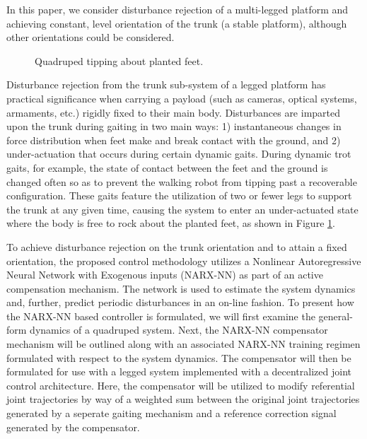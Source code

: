 In this paper, we consider disturbance rejection of a multi-legged platform and achieving constant, level orientation of the trunk (\IE a stable platform), although other orientations could be considered. 
	\begin{figure}[b!]
		\vspace{-7mm}
		\centering
		\caption{ Quadruped tipping about planted feet.}
		\label{fig::quadruped_walking}
	\end{figure}
Disturbance rejection from the trunk sub-system of a legged platform has practical significance when carrying a payload (such as cameras, optical systems, armaments, etc.) rigidly fixed to their main body. Disturbances are imparted upon the trunk during gaiting in two main ways: 1) instantaneous changes in force distribution when feet make and break contact with the ground, and 2) under-actuation that occurs during certain dynamic gaits. During dynamic trot gaits, for example, the state of contact between the feet and the ground is changed often so as to prevent the walking robot from tipping past a recoverable configuration. These gaits feature the utilization of two or fewer legs to support the trunk at any given time, causing the system to enter an under-actuated state where the body is free to rock about the planted feet, as shown in Figure \ref{fig::quadruped_walking}.

To achieve disturbance rejection on the trunk orientation and to attain a fixed orientation, the proposed control methodology utilizes a Nonlinear Autoregressive Neural Network with Exogenous inputs (NARX-NN) as part of an active compensation mechanism. The network is used to estimate the system dynamics and, further, predict periodic disturbances in an on-line fashion. To present how the NARX-NN based controller is formulated, we will first examine the general-form dynamics of a quadruped system. Next, the NARX-NN compensator mechanism will be outlined along with an associated NARX-NN training regimen formulated with respect to the system dynamics. The compensator will then be formulated for use with a legged system implemented with a decentralized joint control architecture. Here, the compensator will be utilized to modify referential joint trajectories by way of a weighted sum between the original joint trajectories generated by a seperate gaiting mechanism and a reference correction signal generated by the compensator.


